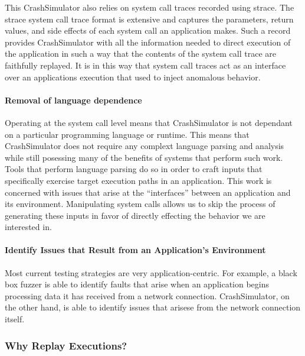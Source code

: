         This CrashSimulator also relies on system call traces recorded using strace.  The strace system call trace format is
        extensive and captures the parameters, return values, and side effects of each system call an application makes.
        Such a record provides CrashSimulator with all the information needed to direct execution of the application in such
        a way that the contents of the system call trace are faithfully replayed.  It is in this way that system call traces
        act as an interface over an applications execution that used to inject anomalous behavior.

        \paragraph{Removal of language dependence}

        Operating at the system call level means that CrashSimulator is not dependant on a particular programming
        language or runtime.  This means that CrashSimulator does not require any complext language parsing and analysis
        while still posessing many of the benefits of systems that perform such work.  Tools that perform language
        parsing do so in order to craft inputs that specifically exercise target execution paths in an application.
        This work is concerned with issues that arise at the ``interfaces'' between an application and its environment.
        Manipulating system calls allows us to skip the process of generating these inputs in favor of directly
        effecting the behavior we are interested in.

        \paragraph{Identify Issues that Result from an Application's Environment}

        Most current testing strategies are very application-centric.  For example, a black box fuzzer is able to
        identify faults that arise when an application begins processing data it has received from a network
        connection. CrashSimulator, on the other hand, is able to identify issues that arisese from the network connection
        itself.

    \subsubsection{Why Replay Executions?}

